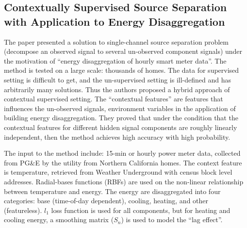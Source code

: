 \documentclass[12pt]{article}
\begin{document}
\subsection{Contextually Supervised Source Separation with Application
  to Energy Disaggregation~\cite{wytock2013contextually}}
The paper presented a solution to single-channel source separation
problem (decompose an observed signal to several un-observed component
signals) under the motivation of ``energy disaggregation of hourly
smart meter data''. The method is tested on a large scale: thousands
of homes. The data for supervised setting is difficult to get, and the
un-supervised setting is ill-defined and has arbitrarily many
solutions. Thus the authors proposed a hybrid approach of contextual
supervised setting. The ``contextual features'' are features that
influences the un-observed signals, environment variables in the
application of building energy disaggregation. They proved that under
the condition that the contextual features for different hidden signal
components are roughly linearly independent, then the method achieves
high accuracy with high probability.

The input to the method include: 15-min or hourly power meter data,
collected from PG\&E by the utility from Northern California
homes. The context feature is temperature, retrieved from Weather
Underground with census block level addresses. Radial-bases functions
(RBFs) are used on the non-linear relationship between temperature and
energy. The energy are disaggregated into four categories: base
(time-of-day dependent), cooling, heating, and other
(featureless). $l_1$ loss function is used for all components, but for
heating and cooling energy, a smoothing matrix ($S_n$) is used to
model the ``lag effect''.
\end{document}
